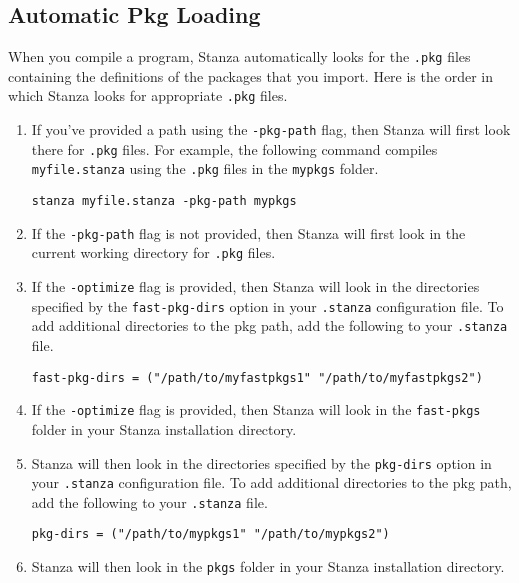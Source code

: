 \documentclass[10pt,oneside]{book}
\begin{document}
\subsection*{Automatic Pkg Loading}
When you compile a program, Stanza automatically looks for the \texttt{\frenchspacing .pkg} files containing the definitions of the packages that you import. Here is the order in which Stanza looks for appropriate \texttt{\frenchspacing .pkg} files.
\begin{enumerate}
\item If you've provided a path using the \texttt{\frenchspacing -pkg-path} flag, then Stanza will first look there for \texttt{\frenchspacing .pkg} files. For example, the following command compiles \texttt{\frenchspacing myfile.stanza} using the \texttt{\frenchspacing .pkg} files in the \texttt{\frenchspacing mypkgs} folder.
\begin{lstlisting}
stanza myfile.stanza -pkg-path mypkgs
\end{lstlisting}

\item If the \texttt{\frenchspacing -pkg-path} flag is not provided, then Stanza will first look in the current working directory for \texttt{\frenchspacing .pkg} files.

\item If the \texttt{\frenchspacing -optimize} flag is provided, then Stanza will look in the directories specified by the \texttt{\frenchspacing fast-pkg-dirs} option in your \texttt{\frenchspacing .stanza} configuration file. To add additional directories to the pkg path, add the following to your \texttt{\frenchspacing .stanza} file.
\begin{lstlisting}
fast-pkg-dirs = ("/path/to/myfastpkgs1" "/path/to/myfastpkgs2")
\end{lstlisting}

\item If the \texttt{\frenchspacing -optimize} flag is provided, then Stanza will look in the \texttt{\frenchspacing fast-pkgs} folder in your Stanza installation directory.

\item Stanza will then look in the directories specified by the \texttt{\frenchspacing pkg-dirs} option in your \texttt{\frenchspacing .stanza} configuration file. To add additional directories to the pkg path, add the following to your \texttt{\frenchspacing .stanza} file.
\begin{lstlisting}
pkg-dirs = ("/path/to/mypkgs1" "/path/to/mypkgs2")
\end{lstlisting}

\item Stanza will then look in the \texttt{\frenchspacing pkgs} folder in your Stanza installation directory.
\end{enumerate}
\end{document}
